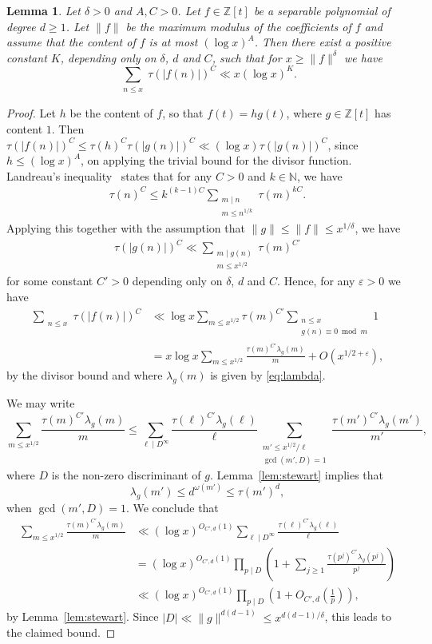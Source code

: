 \documentclass[11pt,letterpaper]{amsart}
\renewcommand{\leq}{\leqslant}
\renewcommand{\geq}{\geqslant}
\newtheorem{lemma}[theorem]{Lemma}
\theoremstyle{definition}
\numberwithin{equation}{section}
\newcommand\ZZ{\mathbb{Z}}
\newcommand\NN{\mathbb{N}}
\newcommand{\g}{\mathbf{g}}
\newcommand{\ve}{\varepsilon}
\newcommand{\0}{\mathbf{0}}
\begin{document}
\begin{lemma}\label{lem:henriot}
Let $\delta>0$ and $A,C>0$. Let $f\in \ZZ[t]$ be a 
separable 
polynomial of degree $d\geq 1$. Let $\|f\|$ be the maximum modulus of the coefficients of $f$ and assume that the content of $f$ is at most $(\log x)^A$. Then there exist a positive constant $K$, depending only on $\delta$, $d$ and $C$, such that for $x\geq \|f\|^{\delta}$ we have
$$
\sum_{\substack{n\leq x}} \tau(|f(n)|)^C \ll x (\log x)^{K}.
$$
\end{lemma}


\begin{proof} 
Let $h$ be the content of $f$, so that $f(t)=hg(t)$, where $g\in \ZZ[t]$ has content $1$.
Then  $\tau(|f(n)|)^C \leq  \tau(h)^C\tau(|g(n)|)^C \ll (\log x) \tau(|g(n)|)^C$, 
since $h\leq (\log x)^A$, 
on applying the trivial bound for the divisor function. 
Landreau's inequality~\cite{landreau} states that for any $C>0$ and $k\in \NN$, we have 
\begin{align*} 
\tau(n)^{C}\leq k^{(k-1)C} \sum_{\substack{m\mid n\\m\leq n^{1/k}}}\tau(m)^{kC}.    
\end{align*}
Applying this together with the assumption that $\|g\|\leq \|f\|\leq x^{1/\delta}$, we have
\begin{align*}
\tau(|g(n)|)^C\ll  \sum_{\substack{m\mid g(n)\\m\leq x^{1/2}}} \tau(m)^{C'}  
\end{align*}
for some constant $C'>0$ depending only on $\delta$, $d$ and $C$. Hence, for any $\ve>0$ we have 
\begin{align*}
 \sum_{\substack{n\leq x}} \tau(|f(n)|)^C &\ll \log x\sum_{m\leq x^{1/2}}\tau(m)^{C'} \sum_{\substack{n\leq x\\g(n)\equiv 0\bmod m}}1\nonumber\\
 &=x\log x \sum_{m\leq x^{1/2}}\frac{\tau(m)^{C'}\lambda_g(m)}{m}+O(x^{1/2+\ve}), 
\end{align*}
by the divisor bound and 
where $\lambda_g(m)$ is given by
\eqref{eq:lambda}.

We may write
$$
\sum_{m\leq x^{1/2}}\frac{\tau(m)^{C'}\lambda_g(m)}{m}
 \leq \sum_{\ell \mid D^{\infty}}\frac{\tau(\ell)^{C'}\lambda_g(\ell)}{\ell}\sum_{\substack{m'\leq x^{1/2}/\ell\\\gcd(m',D)=1}}\frac{\tau(m')^{C'}\lambda_g(m')}{m'},
$$
where $D$ is the 
non-zero discriminant of $g$. 
Lemma~\ref{lem:stewart} implies that 
$$
\lambda_g(m')\leq d^{\omega(m')}\leq \tau(m')^d, 
$$
when $\gcd(m',D)=1$.
We conclude that 
\begin{align*}
\sum_{m\leq x^{1/2}}\frac{\tau(m)^{C'}\lambda_g(m)}{m}
&\ll (\log x)^{O_{C',d}(1)} \sum_{\ell \mid D^{\infty}}\frac{\tau(\ell)^{C'}\lambda_g(\ell)}{\ell}\\
 &=(\log x)^{O_{C',d}(1)} \prod_{p\mid D}\left(1+\sum_{j\geq 1}\frac{\tau(p^{j})^{C'}\lambda_g(p^j)}{p^j}\right)\\
 &\ll (\log x)^{O_{C',d}(1)}\prod_{p\mid D}\left(1+O_{C',d}\left(\frac{1}{p}\right)\right),
\end{align*}
by Lemma~\ref{lem:stewart}. 
Since $|D|\ll \|g\|^{d(d-1)}\leq x^{d(d-1)/\delta}$, this leads to the  claimed bound.
\end{proof}
\end{document}

